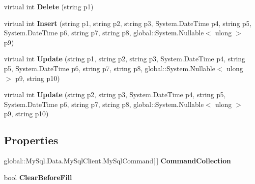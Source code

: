 \begin{DoxyCompactItemize}
\item 
virtual int {\bfseries Delete} (string p1)\hypertarget{class_products_1_1_data_1_1ds_sage_table_adapters_1_1ta_offer_a240cf1c1dc446149397d997cac52d3a1}{}\label{class_products_1_1_data_1_1ds_sage_table_adapters_1_1ta_offer_a240cf1c1dc446149397d997cac52d3a1}

\item 
virtual int {\bfseries Insert} (string p1, string p2, string p3, System.\+Date\+Time p4, string p5, System.\+Date\+Time p6, string p7, string p8, global\+::\+System.\+Nullable$<$ ulong $>$ p9)\hypertarget{class_products_1_1_data_1_1ds_sage_table_adapters_1_1ta_offer_a23a0836a054bd41a7ea937173a2fcd7e}{}\label{class_products_1_1_data_1_1ds_sage_table_adapters_1_1ta_offer_a23a0836a054bd41a7ea937173a2fcd7e}

\item 
virtual int {\bfseries Update} (string p1, string p2, string p3, System.\+Date\+Time p4, string p5, System.\+Date\+Time p6, string p7, string p8, global\+::\+System.\+Nullable$<$ ulong $>$ p9, string p10)\hypertarget{class_products_1_1_data_1_1ds_sage_table_adapters_1_1ta_offer_a4a8e9bd1673fb502c7f5416bd8018ea1}{}\label{class_products_1_1_data_1_1ds_sage_table_adapters_1_1ta_offer_a4a8e9bd1673fb502c7f5416bd8018ea1}

\item 
virtual int {\bfseries Update} (string p2, string p3, System.\+Date\+Time p4, string p5, System.\+Date\+Time p6, string p7, string p8, global\+::\+System.\+Nullable$<$ ulong $>$ p9, string p10)\hypertarget{class_products_1_1_data_1_1ds_sage_table_adapters_1_1ta_offer_aed587b1c7591309c80962bd4406a50e3}{}\label{class_products_1_1_data_1_1ds_sage_table_adapters_1_1ta_offer_aed587b1c7591309c80962bd4406a50e3}

\end{DoxyCompactItemize}
\subsection*{Properties}
\begin{DoxyCompactItemize}
\item 
global\+::\+My\+Sql.\+Data.\+My\+Sql\+Client.\+My\+Sql\+Command\mbox{[}$\,$\mbox{]} {\bfseries Command\+Collection}\hypertarget{class_products_1_1_data_1_1ds_sage_table_adapters_1_1ta_offer_ac18fb523d211bb97b09d5e34917d7737}{}\label{class_products_1_1_data_1_1ds_sage_table_adapters_1_1ta_offer_ac18fb523d211bb97b09d5e34917d7737}

\item 
bool {\bfseries Clear\+Before\+Fill}\hypertarget{class_products_1_1_data_1_1ds_sage_table_adapters_1_1ta_offer_a0dbda10a77925407c06e588568868467}{}\label{class_products_1_1_data_1_1ds_sage_table_adapters_1_1ta_offer_a0dbda10a77925407c06e588568868467}

\end{DoxyCompactItemize}


